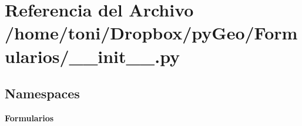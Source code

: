 \section{Referencia del Archivo /home/toni/\-Dropbox/py\-Geo/\-Formularios/\-\_\-\-\_\-init\-\_\-\-\_\-.py}
\label{Formularios_2____init_____8py}
\subsection*{Namespaces}
\begin{DoxyCompactItemize}
\item 
{\bf Formularios}
\end{DoxyCompactItemize}
